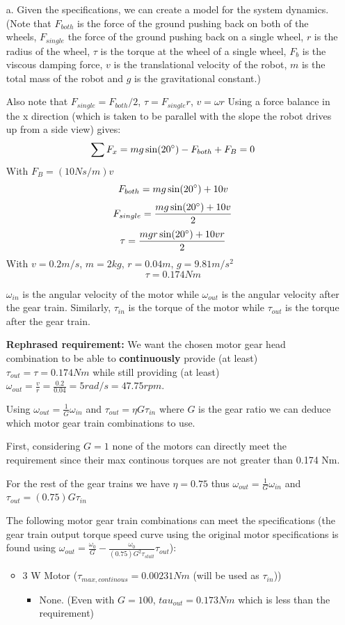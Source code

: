 \documentclass[12pt]{article}
\begin{document}
\begin{itemize}
    \item[a.] 
    Given the specifications, we can create a model for the system dynamics.
    (Note that $F_{both}$ is the force of the ground pushing back on both of the wheels, $F_{single}$ the force of the ground pushing back on a single wheel, $r$ is the radius of the wheel, $\tau$ is the torque at the wheel of a single wheel, $F_b$ is the viscous damping force, $v$ is the translational velocity of the robot, $m$ is the total mass of the robot and $g$ is the gravitational constant.)

    Also note that $F_{single} = F_{both}/2$, $\tau = F_{single} r$, $v = \omega r$
    Using a force balance in the x direction (which is taken to be parallel with the slope the robot drives up from a side view) gives:
    \[
        \sum F_x = mg\sin(20\degree) - F_{both} + F_B = 0
    \]
    With $F_B = (10 Ns/m) v$ 
    \[
        F_{both} = mg\sin(20\degree) + 10v
    \]
    \[
        F_{single} = \frac{mg\sin(20\degree) + 10v}{2}
    \]
    \[
        \tau = \frac{mgr\sin(20\degree) + 10vr}{2}
    \]
    With $v = 0.2 m/s$, $m=2kg$, $r=0.04m$, $g=9.81m/s^2$
    \[
        \tau = 0.174 Nm
    \]

    $\omega_{in}$ is the angular velocity of the motor while $\omega_{out}$ is the angular velocity after the gear train.
    Similarly, $\tau_{in}$ is the torque of the motor while $\tau_{out}$ is the torque after the gear train.

    \textbf{Rephrased requirement:} We want the chosen motor gear head combination to be able to \textbf{continuously} provide (at least) $\tau_{out} = \tau = 0.174 Nm$ while still providing (at least) $\omega_{out} = \frac{v}{r} = \frac{0.2}{0.04} = 5 rad/s = 47.75 rpm$.

    Using $\omega_{out} = \frac{1}{G}\omega_{in}$ and $\tau_{out} = \eta G \tau_{in}$ where $G$ is the gear ratio we can deduce which motor gear train combinations to use.

    First, considering $G = 1$ none of the motors can directly meet the requirement since their max continous torques are not greater than 0.174 Nm.

    For the rest of the gear trains we have $\eta = 0.75$ thus $\omega_{out} = \frac{1}{G}\omega_{in}$ and $\tau_{out} = (0.75) G \tau_{in}$ 

    The following motor gear train combinations can meet the specifications (the gear train output torque speed curve using the original motor specifications is found using $\omega_{out} = \frac{\omega_0}{G} - \frac{\omega_0}{(0.75)G^2\tau_{stall}}\tau_{out}$): 
    \begin{itemize}
        \item 
        3 W Motor ($\tau_{max, continous} = 0.00231 Nm$ (will be used as $\tau_{in}$))
        \begin{itemize}
            \item
            None. (Even with $G=100$, $tau_{out} = 0.173 Nm$ which is less than the requirement)
        \end{itemize}


\end{itemize}
\end{itemize}
\end{document}
